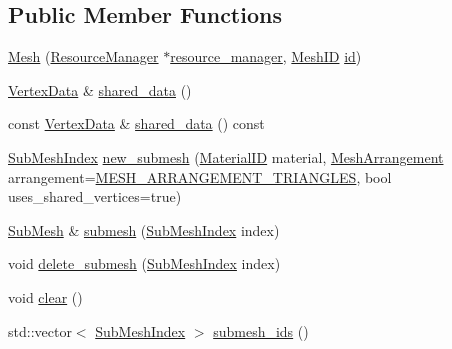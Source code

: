\subsection*{Public Member Functions}
\begin{DoxyCompactItemize}
\item 
\hyperlink{classkglt_1_1_mesh_aca3de21a21d2773a563bcc9f5bddcaf4}{Mesh} (\hyperlink{classkglt_1_1_resource_manager}{Resource\-Manager} $\ast$\hyperlink{classkglt_1_1_resource_a966a14c55828b2adc52aad0fac828205}{resource\-\_\-manager}, \hyperlink{namespacekglt_a525b047f668a129a0b102be7f2fe32be}{Mesh\-I\-D} \hyperlink{classkglt_1_1generic_1_1_identifiable_a7930d0f7da424ad524d888726fcc12bd}{id})
\item 
\hyperlink{classkglt_1_1_vertex_data}{Vertex\-Data} \& \hyperlink{classkglt_1_1_mesh_a9a22675979d33496731c967910fd3e5d}{shared\-\_\-data} ()
\item 
const \hyperlink{classkglt_1_1_vertex_data}{Vertex\-Data} \& \hyperlink{classkglt_1_1_mesh_a31e146c27aa311685944ba4c906d5a2a}{shared\-\_\-data} () const 
\item 
\hyperlink{namespacekglt_aa750d1bb3b7a0d679b32c96fed625213}{Sub\-Mesh\-Index} \hyperlink{classkglt_1_1_mesh_a8480149cbf7173c4896bfe6d57ae3046}{new\-\_\-submesh} (\hyperlink{namespacekglt_a5ffac6377a7d3e163b4d5c31f71db43a}{Material\-I\-D} material, \hyperlink{namespacekglt_a4d5a692708f38d0176dd6f5d341289da}{Mesh\-Arrangement} arrangement=\hyperlink{namespacekglt_a4d5a692708f38d0176dd6f5d341289daa10bc529bd0233d4686437519a810138d}{M\-E\-S\-H\-\_\-\-A\-R\-R\-A\-N\-G\-E\-M\-E\-N\-T\-\_\-\-T\-R\-I\-A\-N\-G\-L\-E\-S}, bool uses\-\_\-shared\-\_\-vertices=true)
\item 
\hyperlink{classkglt_1_1_sub_mesh}{Sub\-Mesh} \& \hyperlink{classkglt_1_1_mesh_a2ce8d3df0558cab15335d49891823fa1}{submesh} (\hyperlink{namespacekglt_aa750d1bb3b7a0d679b32c96fed625213}{Sub\-Mesh\-Index} index)
\item 
void \hyperlink{classkglt_1_1_mesh_a207fe90b697c0cbc7b2f4befbaa4a8e8}{delete\-\_\-submesh} (\hyperlink{namespacekglt_aa750d1bb3b7a0d679b32c96fed625213}{Sub\-Mesh\-Index} index)
\item 
void \hyperlink{classkglt_1_1_mesh_a87121cbe7ba3a15f849f2b2205fb1778}{clear} ()
\item 
std\-::vector$<$ \hyperlink{namespacekglt_aa750d1bb3b7a0d679b32c96fed625213}{Sub\-Mesh\-Index} $>$ \hyperlink{classkglt_1_1_mesh_a1c0351769872c006cb815eef51783c61}{submesh\-\_\-ids} ()
\end{DoxyCompactItemize}
